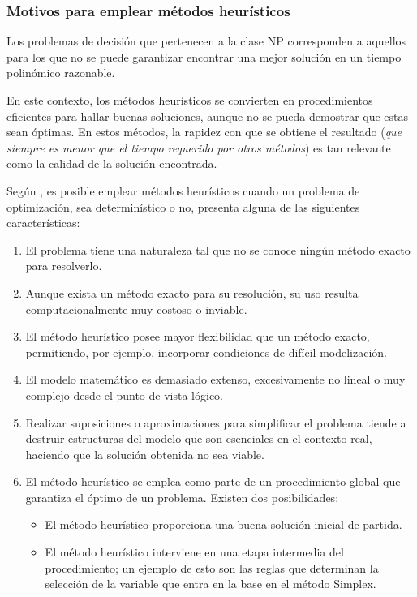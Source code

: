\documentclass[12pt,titlepage,twoside,openright]{book}
\begin{document}
\subsubsection{Motivos para emplear métodos heurísticos}

Los problemas de decisión que pertenecen a la clase NP corresponden a aquellos para los que no se puede garantizar encontrar una mejor solución en un tiempo polinómico razonable.

En este contexto, los métodos heurísticos se convierten en procedimientos eficientes para hallar buenas soluciones, aunque no se pueda demostrar que estas sean óptimas. En estos métodos, la rapidez con que se obtiene el resultado (\textit{que siempre es menor que el tiempo requerido por otros métodos}) es tan relevante como la calidad de la solución encontrada.

Según \citep{antonioSuarez2014}, es posible emplear métodos heurísticos cuando un problema de optimización, sea determinístico o no, presenta alguna de las siguientes características:


\begin{enumerate}[label=\alph*.]
	\item El problema tiene una naturaleza tal que no se conoce ningún método exacto para resolverlo.
	\item Aunque exista un método exacto para su resolución, su uso resulta computacionalmente muy costoso o inviable.
	\item El método heurístico posee mayor flexibilidad que un método exacto, permitiendo, por ejemplo, incorporar condiciones de difícil modelización.
	\item El modelo matemático es demasiado extenso, excesivamente no lineal o muy complejo desde el punto de vista lógico.
	\item Realizar suposiciones o aproximaciones para simplificar el problema tiende a destruir estructuras del modelo que son esenciales en el contexto real, haciendo que la solución obtenida no sea viable.
	\item El método heurístico se emplea como parte de un procedimiento global que garantiza el óptimo de un problema. Existen dos posibilidades:
	      \begin{itemize}
		      \item El método heurístico proporciona una buena solución inicial de partida.
		      \item El método heurístico interviene en una etapa intermedia del procedimiento; un ejemplo de esto son las reglas que determinan la selección de la variable que entra en la base en el método Simplex.
	      \end{itemize}
\end{enumerate}
\end{document}
